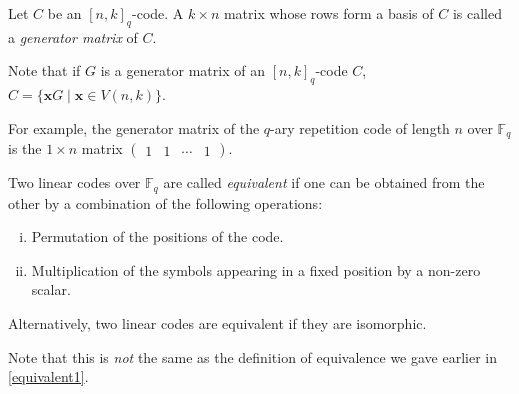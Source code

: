 
\begin{definition}
    Let $C$ be an $[n,k]_q$-code. A $k\times n$ matrix whose rows form a basis of $C$ is called a \textit{generator matrix} of $C$.
\end{definition}

Note that if $G$ is a generator matrix of an $[n,k]_q$-code $C$, $C=\{\textbf{x}G\mid \textbf{x}\in V(n,k)\}$.

For example, the generator matrix of the $q$-ary repetition code of length $n$ over $\mathbb{F}_q$ is the $1\times n$ matrix $\begin{pmatrix}1 & 1 & \cdots & 1\end{pmatrix}$.

\begin{definition}
    Two linear codes over $\mathbb{F}_q$ are called \textit{equivalent} if one can be obtained from the other by a combination of the following operations:
    \begin{enumerate}[(i)]
        \item Permutation of the positions of the code.
        \item Multiplication of the symbols appearing in a fixed position by a non-zero scalar.
    \end{enumerate}
\end{definition}

Alternatively, two linear codes are equivalent if they are isomorphic.

Note that this is \textit{not} the same as the definition of equivalence we gave earlier in \ref{equivalent1}.

